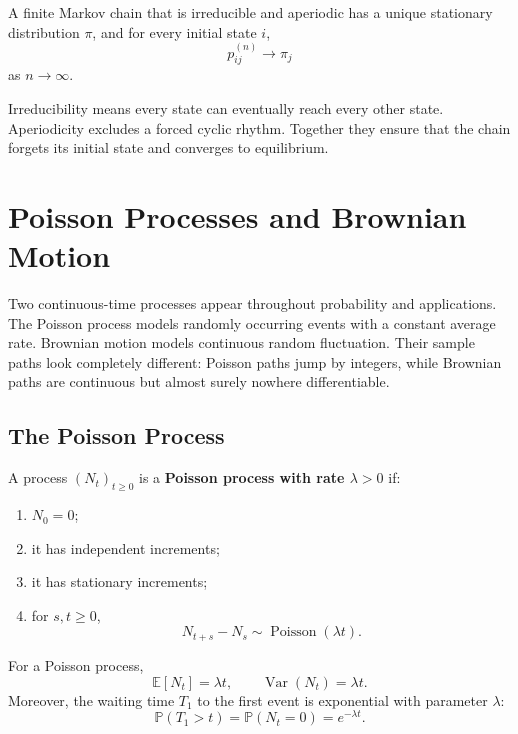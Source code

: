 \begin{theorem}
A finite Markov chain that is irreducible and aperiodic has a unique stationary distribution $\pi$, and for every initial state $i$,
\[
    p_{ij}^{(n)}\to\pi_j
\]
as $n\to\infty$.
\end{theorem}

\begin{remark}
Irreducibility means every state can eventually reach every other state. Aperiodicity excludes a forced cyclic rhythm. Together they ensure that the chain forgets its initial state and converges to equilibrium.
\end{remark}

\section{Poisson Processes and Brownian Motion}

Two continuous-time processes appear throughout probability and applications. The Poisson process models randomly occurring events with a constant average rate. Brownian motion models continuous random fluctuation. Their sample paths look completely different: Poisson paths jump by integers, while Brownian paths are continuous but almost surely nowhere differentiable.

\subsection{The Poisson Process}

\begin{definition}
A process $(N_t)_{t\geq0}$ is a \textbf{Poisson process with rate $\lambda>0$} if:
\begin{enumerate}
    \item $N_0=0$;
    \item it has independent increments;
    \item it has stationary increments;
    \item for $s,t\geq0$,
    \[
        N_{t+s}-N_s\sim\operatorname{Poisson}(\lambda t).
    \]
\end{enumerate}
\end{definition}

\begin{proposition}
For a Poisson process,
\[
    \mathbb{E}[N_t]=\lambda t,
    \qquad
    \operatorname{Var}(N_t)=\lambda t.
\]
Moreover, the waiting time $T_1$ to the first event is exponential with parameter $\lambda$:
\[
    \mathbb{P}(T_1>t)=\mathbb{P}(N_t=0)=e^{-\lambda t}.
\]
\end{proposition}

